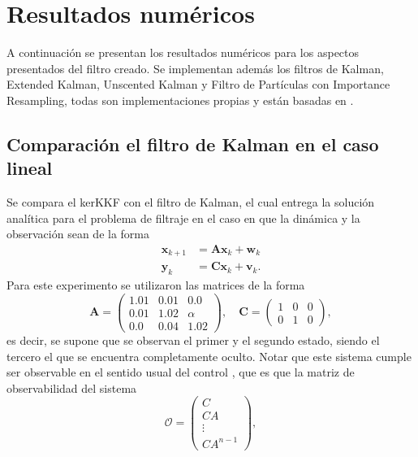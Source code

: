 \section{Resultados numéricos}

A continuación se presentan los resultados numéricos para los aspectos presentados del filtro creado. Se implementan además los filtros de Kalman, Extended Kalman, Unscented Kalman y Filtro de Partículas con Importance Resampling, todas son implementaciones propias y están basadas en \cite{Setoodeh2022NonlinearApplications}.

\subsection{Comparación el filtro de Kalman en el caso lineal}

Se compara el kerKKF con el filtro de Kalman, el cual entrega la solución analítica para el problema de filtraje en el caso en que la dinámica y la observación sean de la forma
\begin{equation*}
    \begin{aligned}
        \mathbf{x}_{k+1} &= \mathbf{A} \mathbf{x}_k + \mathbf{w}_k \\
        \mathbf{y}_k &= \mathbf{C} \mathbf{x}_k + \mathbf{v}_k.
    \end{aligned}
\end{equation*}
Para este experimento se utilizaron las matrices de la forma
\begin{equation*}
    \mathbf{A} =
    \begin{pmatrix}
        1.01 & 0.01 & 0.0 \\
        0.01 & 1.02 & \alpha \\
        0.0 & 0.04 & 1.02
    \end{pmatrix},
    \quad  \mathbf{C} = 
    \begin{pmatrix}
        1 & 0 & 0 \\
        0 & 1 & 0
    \end{pmatrix},
\end{equation*}
es decir, se supone que se observan el primer y el segundo estado, siendo el tercero el que se encuentra completamente oculto. Notar que este sistema cumple ser observable en el sentido usual del control \cite{Trelat2013ControleApplications}, que es que la matriz de observabilidad del sistema
\begin{equation*}
    \mathcal{O} = \begin{pmatrix}
        C \\
        CA \\
        \vdots \\
        CA^{n-1}
    \end{pmatrix},
\end{equation*}
